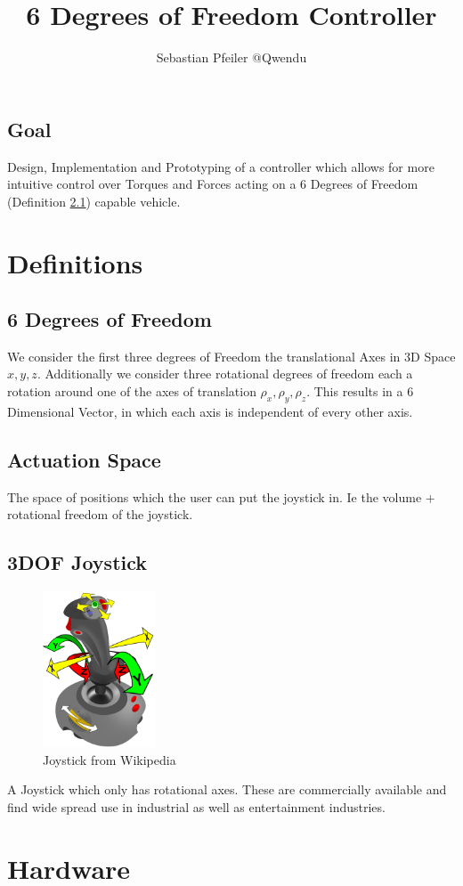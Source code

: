 \documentclass[12pt,a4paper]{report}
\def\refdefinition#1{#1 \citedefinition{#1}}
\def\citedefinition#1{(Definition \ref{def:#1})}
\def\definition#1#2{
	\section{#1}\label{def:#1}
	#2
}
\begin{document}
	\title{6 Degrees of Freedom Controller}
	\author{Sebastian Pfeiler @Qwendu}
	\maketitle
	\newpage
	\tableofcontents
	\newpage
	\section{Goal}
	Design, Implementation and Prototyping of a controller which allows for more intuitive control over Torques and Forces acting on a \refdefinition{6 Degrees of Freedom} capable vehicle.
	\chapter{Definitions}

	\definition{6 Degrees of Freedom}{
		We consider the first three degrees of Freedom the translational Axes in 3D Space $x,y,z$.
		Additionally we consider three rotational degrees of freedom each a rotation around one of the axes of translation $\rho_x, \rho_y, \rho_z$. This results in a 6 Dimensional Vector, in which each axis is independent of every other axis.
	}
	\definition{Actuation Space}{
		The space of positions which the user can put the joystick in. Ie the volume + rotational freedom of the joystick.
	}

	\definition{3DOF Joystick}{
		\begin{figure}
			\includegraphics[width=0.3\textwidth]{"media/Wikipedia_Joystick.png"}
			\caption{Joystick from Wikipedia \cite{web:wiki:Joystick}}
			\label{fig:Wikipedia Joystick}
		\end{figure}
		A Joystick which only has rotational axes. These are commercially available and find wide spread use in industrial as well as entertainment industries.
	}
	
	\chapter{Hardware}
\end{document}
